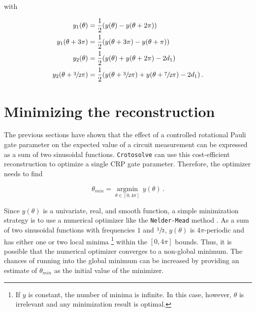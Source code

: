 with

\begin{subequations}
    \label{eq:measurements}
    \begin{align}
        y_1(\theta) &= \frac12(y(\theta) - y(\theta + 2\pi))\\
        y_1(\theta + 3\pi) &= \frac12(y(\theta + 3\pi) - y(\theta + \pi))\\
        y_2(\theta) &= \frac12(y(\theta) + y(\theta + 2\pi) - 2d_1)\\
        y_2(\theta + \sfrac32\pi) &= \frac12(y(\theta + \sfrac32\pi) + y(\theta + \sfrac72\pi) - 2d_1)
        \,.
    \end{align}
\end{subequations}

\section{Minimizing the reconstruction}
\label{sec:minimization}

The previous sections have shown that the effect of a controlled rotational
Pauli gate parameter on the expected value of a circuit measurement can be
expressed as a sum of two sinusoidal functions.
\texttt{Crotosolve} can use this cost-efficient reconstruction to optimize a
single CRP gate parameter.
Therefore, the optimizer needs to find

\begin{equation}
    \theta_{min} = \underset{\theta \in [0, 4\pi]}{\operatorname{argmin}}\, y(\theta)\,.
\end{equation}

Since $y(\theta)$ is a univariate, real, and smooth function, a simple
minimization strategy is to use a numerical optimizer like the
\texttt{Nelder-Mead} method \cite{nelder_simplex_1965}.
As a sum of two sinusoidal functions with frequencies $1$ and $\sfrac12$,
$y(\theta)$ is $4\pi$-periodic and has either one or two local minima%
\footnote{
    If $y$ is constant, the number of minima is infinite.
    In this case, however, $\theta$ is irrelevant and any minimization result is
    optimal.}
within the $[0, 4\pi]$ bounds.
Thus, it is possible that the numerical optimizer converges to a non-global
minimum.
The chances of running into the global minimum can be increased by providing an
estimate of $\theta_{min}$ as the initial value of the minimizer.

